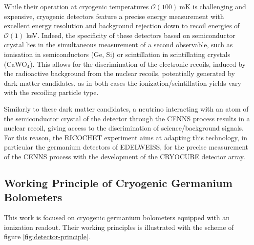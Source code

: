 While their operation at cryogenic temperatures $\mathcal{O}(100)\ \si{\milli\kelvin}$ is challenging and expensive, cryogenic detectors feature a precise energy measurement with excellent energy resolution and background rejection down to recoil energies of $\mathcal{O}(1)$ \si{\kilo\eV}.
Indeed, the specificity of these detectors based on semiconductor crystal lies in the simultaneous measurement of a second observable, such as ionisation in semiconductors (Ge, Si) or scintillation in scintillating crystals (CaWO$_4$). This allows for the discrimination of the electronic recoils, induced by the radioactive background from the nuclear recoils, potentially generated by dark matter candidates, as in both cases the ionization/scintillation yields vary with the recoiling particle type.

Similarly to these dark matter candidates, a neutrino interacting with an atom of the semiconductor crystal of the detector through the CENNS process results in a nuclear recoil, giving access to the discrimination of science/background signals.
For this reason, the RICOCHET experiment aims at adapting this technology, in particular the germanium detectors of EDELWEISS, for the precise measurement of the CENNS process with the development of the CRYOCUBE detector array.


\subsection{Working Principle of Cryogenic Germanium Bolometers}

This work is focused on cryogenic germanium bolometers equipped with an ionization readout. Their working principles is illustrated with the scheme of figure \ref{fig:detector-principle}.

